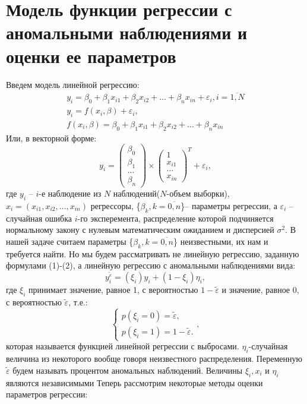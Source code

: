 \documentclass[12pt]{article}
\begin{document}
\section{Модель функции регрессии с аномальными наблюдениями и оценки ее параметров}
Введем модель линейной регрессию:\hfill\break
\begin{eqnarray}
    y_i=\beta_0+\beta_1 x_{i1}+\beta_2 x_{i2}+\dots+\beta_n x_{in}+\varepsilon_i, i=\overline{1,N}\\
    \nonumber y_i= f(x_i,\beta)+\varepsilon_i,\\
    \nonumber f(x_i,\beta)=\beta_0+\beta_1 x_{i1}+\beta_2 x_{i2}+\dots+\beta_n x_{in}
\end{eqnarray}
Или, в векторной форме:
\begin{equation}
    y_i= 
    \begin{pmatrix}
        \beta_0\\
        \beta_1\\
        \dots\\
        \beta_n
    \end{pmatrix}\times
    \begin{pmatrix}
        1\\
        x_{i1}\\
        \dots\\
        x_{in}
    \end{pmatrix}^{T}+ \varepsilon_i,
\end{equation}
где $y_i$ -- $i$-е наблюдение из $N$ наблюдений($N$-объем выборки), $x_i=(x_{i1},x_{i2},\dots,x_{in})$ регрессоры, \{$\beta_k, k=\overline{0,n}$\}-- параметры регрессии, а $\varepsilon_i$ -- случайная ошибка $i$-го эксперемента, распределение которой подчиняется нормальному закону с нулевым математическим ожиданием и дисперсией $\sigma^2$.\hfill\break
В нашей задаче считаем параметры \{$\beta_k, k=\overline{0,n}$\} неизвестными, их нам и требуется найти.\hfill\break
Но мы будем рассматривать не линейную регрессию, заданную формулами (1)-(2), а линейную регрессию с аномальными наблюдениями вида:
\begin{equation}
    y_i^{\widetilde{\varepsilon}}=(\xi_i)y_i+ (1-\xi_i)\eta_i,
\end{equation}
где $\xi_i$ принимает значение, равное 1, с вероятностью $1-\widetilde{\varepsilon}$ и значение, равное 0, с вероятностью $\widetilde{\varepsilon}$, т.е.:
\begin{equation}
    \begin{cases}
        p(\xi_i=0)=\widetilde{\varepsilon},\\
        p(\xi_i=1)=1-\widetilde{\varepsilon}.
    \end{cases},
\end{equation}
которая называется функцией линейной регрессии с выбросами. $\eta_i$-случайная величина из некоторого вообще говоря неизвестного распределения.
 Переменную $\widetilde{\varepsilon}$ будем называть процентом аномальных наблюдений. Величины $\xi_i, x_i$ и $\eta_i$ являются независимыми \hfill\break
Теперь рассмотрим некоторые методы оценки параметров регрессии:
\end{document}
